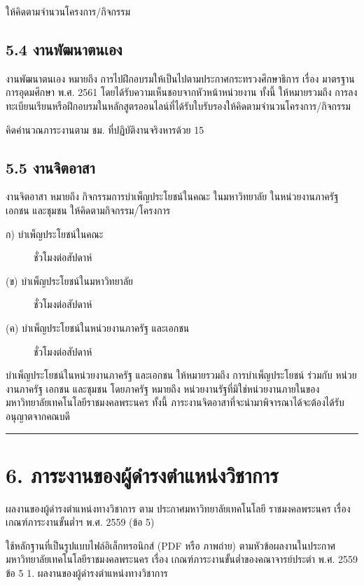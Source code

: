 \documentclass[a4paper,12pt,english]{sphinxmanual}
\begin{document}
ให้คิดตามจำนวนโครงการ/กิจกรรม


\subsection{5.4 งานพัฒนาตนเอง}
\label{\detokenize{workload_rubric:id96}}
งานพัฒนาตนเอง หมายถึง การไปฝึกอบรมให้เป็นไปตามประกาศกระทรวงศึกษาธิการ เรื่อง มาตรฐานการอุดมศึกษา พ.ศ. 2561 โดยได้รับความเห็นชอบจากหัวหน้าหน่วยงาน ทั้งนี้ ให้หมายรวมถึง การลงทะเบียนเรียนหรือฝึกอบรมในหลักสูตรออนไลน์ที่ได้รับใบรับรองให้คิดตามจำนวนโครงการ/กิจกรรม

คิดคำนวณภาระงานตาม ชม. ที่ปฏิบัติงานจริงหารด้วย 15


\subsection{5.5 งานจิตอาสา}
\label{\detokenize{workload_rubric:id97}}
งานจิตอาสา หมายถึง กิจกรรมการบำเพ็ญประโยชน์ในคณะ ในมหาวิทยาลัย ในหน่วยงานภาครัฐ เอกชน และชุมชน
ให้คิดตามกิจกรรม/โครงการ
\begin{description}
\item[{ก) บำเพ็ญประโยชน์ในคณะ}]  ชั่วโมงต่อสัปดาห์

\item[{(ข) บำเพ็ญประโยชน์ในมหาวิทยาลัย}]  ชั่วโมงต่อสัปดาห์

\item[{(ค) บำเพ็ญประโยชน์ในหน่วยงานภาครัฐ และเอกชน}]  ชั่วโมงต่อสัปดาห์

\end{description}

บำเพ็ญประโยชน์ในหน่วยงานภาครัฐ และเอกชน ให้หมายรวมถึง การบำเพ็ญประโยชน์ ร่วมกับ หน่วยงานภาครัฐ เอกชน และชุมชน โดยภาครัฐ หมายถึง หน่วยงานรัฐที่มิใช่หน่วยงานภายในของมหาวิทยาลัยเทคโนโลยีราชมงคลพระนคร ทั้งนี้ ภาระงานจิตอาสาที่จะนำมาพิจารณาได้จะต้องได้รับอนุญาตจากคณบดี


\bigskip\hrule\bigskip



\section{6. ภาระงานของผู้ดำรงตำแหน่งวิชาการ}
\label{\detokenize{workload_rubric:id98}}
ผลงานของผู้ดำรงตำแหน่งทางวิชาการ ตาม ประกาศมหาวิทยาลัยเทคโนโลยี
ราชมงคลพระนคร เรื่อง เกณฑ์ภาระงานขั้นต่ำฯ พ.ศ. 2559 (ข้อ 5)

ใช้หลักฐานที่เป็นรูปแบบไฟล์อิเล็กทรอนิกส์ (PDF หรือ ภาพถ่าย) ตามหัวข้อผลงานในประกาศมหาวิทยาลัยเทคโนโลยีราชมงคลพระนคร เรื่อง เกณฑ์ภาระงานขั้นต่ำของคณาจารย์ประตำ พ.ศ. 2559 ข้อ 5 1. ผลงานของผู้ดำรงตำแหน่งทางวิชาการ
\end{document}
